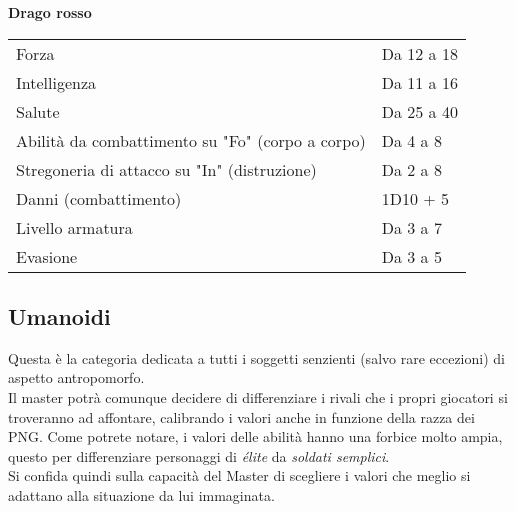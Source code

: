 \documentclass[../manuale_main.tex]{subfiles}
\begin{document}
\begin{center}

\textbf{Drago rosso}\\
\renewcommand{\arraystretch}{1.2}
\begin{tabularx}{\linewidth}{Q F}
Forza&Da 12 a 18\\
Intelligenza&Da 11 a 16\\
Salute&Da 25 a 40\\
Abilità da combattimento su "Fo" (corpo a corpo)&Da 4 a 8\\
Stregoneria di attacco su "In" (distruzione)&Da 2 a 8\\
Danni (combattimento)&1D10 + 5\\
Livello armatura&Da 3 a 7\\
Evasione&Da 3 a 5\\
\end{tabularx}

\end{center}


\clearpage

\subsection{Umanoidi}
Questa è la categoria dedicata a tutti i soggetti senzienti (salvo rare eccezioni) di aspetto antropomorfo.\\
Il master potrà comunque decidere di differenziare i rivali che i propri giocatori si troveranno ad affontare, calibrando i valori anche in funzione della razza dei PNG. Come potrete notare, i valori delle abilità hanno una forbice molto ampia, questo per differenziare personaggi di \emph{élite} da \emph{soldati semplici}.\\
Si confida quindi sulla capacità del Master di scegliere i valori che meglio si adattano alla situazione da lui immaginata.\\
\end{document}
